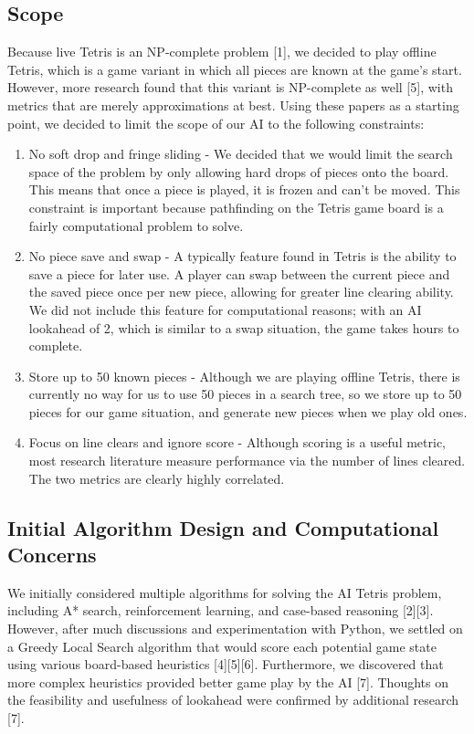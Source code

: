 \documentclass[11pt]{article}
\begin{document}
\subsection{Scope}
Because live Tetris is an NP-complete problem [1], we decided to play offline Tetris, which is a game variant in which all pieces are known at the game’s start. However, more research found that this variant is NP-complete as well [5], with metrics that are merely approximations at best. Using these papers as a starting point, we decided to limit the scope of our AI to the following constraints:
\begin{enumerate}
\item No soft drop and fringe sliding - We decided that we would limit the search space of the problem by only allowing hard drops of pieces onto the board. This means that once a piece is played, it is frozen and can’t be moved. This constraint is important because pathfinding on the Tetris game board is a fairly computational problem to solve.
\item No piece save and swap - A typically feature found in Tetris is the ability to save a piece for later use. A player can swap between the current piece and the saved piece once per new piece, allowing for greater line clearing ability. We did not include this feature for computational reasons; with an AI lookahead of 2, which is similar to a swap situation, the game takes hours to complete.
\item Store up to 50 known pieces - Although we are playing offline Tetris, there is currently no way for us to use 50 pieces in a search tree, so we store up to 50 pieces for our game situation, and generate new pieces when we play old ones.
\item Focus on line clears and ignore score - Although scoring is a useful metric, most research literature measure performance via the number of lines cleared. The two metrics are clearly highly correlated.
\end{enumerate}

\subsection{Initial Algorithm Design and Computational Concerns}
We initially considered multiple algorithms for solving the AI Tetris problem, including A* search, reinforcement learning, and case-based reasoning [2][3]. However, after much discussions and experimentation with Python, we settled on a Greedy Local Search algorithm that would score each potential game state using various board-based heuristics [4][5][6]. Furthermore, we discovered that more complex heuristics provided better game play by the AI [7]. Thoughts on the feasibility and usefulness of lookahead were confirmed by additional research [7]. 
\end{document}
